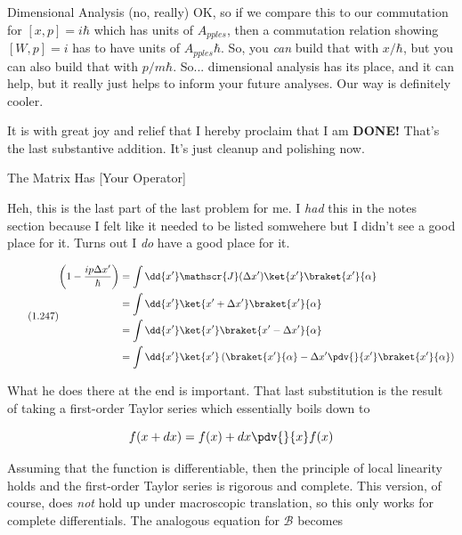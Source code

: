 \begin{answer}
\begin{answerpart}{Dimensional Analysis (no, really)}
    OK, so if we compare this to our commutation for $[x, p] = i\hbar$
    which has units of $A_{pples}$, then a commutation relation
    showing $[W, p] = i$ has to have units of $A_{pples}\hbar$.  So,
    you \emph{can} build that with $x/\hbar$, but you can also build
    that with $p/m\hbar$.  So... dimensional analysis has its place,
    and it can help, but it really just helps to inform your future
    analyses.  Our way is definitely cooler.

    It is with great joy and relief that I hereby proclaim that I am
    {\huge \bfseries DONE!}  That's the last substantive addition.
    It's just cleanup and polishing now.
  \end{answerpart}

  \begin{answerpart}{The Matrix Has [Your Operator]}

    Heh, this is the last part of the last problem for me.  I
    \emph{had} this in the notes section because I felt like it needed
    to be listed somwehere but I didn't see a good place for it.
    Turns out I \emph{do} have a good place for it.

    \begin{equation}
      \tag{1.247}
      \begin{split}
        \left(1 - \frac{ip\Delta x'}{\hbar}\right)
        &=
        \int \dd{x'}
        \mathscr{J}(\Delta x')\ket{x'}\braket{x'}{\alpha}
        \\
        &=
        \int \dd{x'}
        \ket{x' + \Delta x'}\braket{x'}{\alpha}
        \\
        &=
        \int \dd{x'}
        \ket{x'}\braket{x' -  \Delta x'}{\alpha}
        \\
        &=
        \int \dd{x'}
        \ket{x'}
        \left(
        \braket{x'}{\alpha} - \Delta x' \pdv{}{x'}\braket{x'}{\alpha}
        \right)
        \\
      \end{split}
    \end{equation}

    What he does there at the end is important.  That last
    substitution is the result of taking a first-order Taylor series
    which essentially boils down to

    \begin{equation}
      f(x + dx) = f(x) + dx\pdv{}{x}f(x)
    \end{equation}

    Assuming that the function is differentiable, then the principle
    of local linearity holds and the first-order Taylor series is
    rigorous and complete.  This version, of course, does \emph{not}
    hold up under macroscopic translation, so this only works for
    complete differentials.  The analogous equation for $\mathscr{B}$
    becomes


\end{answerpart}
\end{answer}
